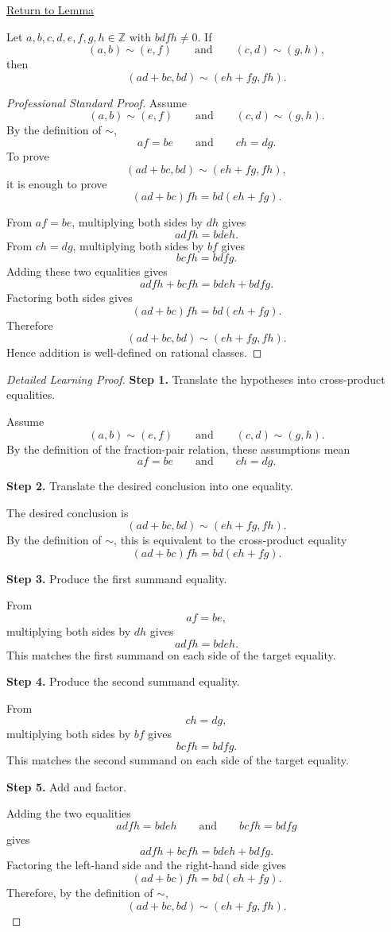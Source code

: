 \newpage
{}
\label{prf:rational-addition-well-defined}

\begin{remark*}[Return]
\hyperref[lem:rational-addition-well-defined]{Return to Lemma}
\end{remark*}

\begin{lemma*}
Let $a,b,c,d,e,f,g,h\in\mathbb{Z}$ with $bdfh\neq 0$. If
\[
(a,b)\sim(e,f)
\qquad\text{and}\qquad
(c,d)\sim(g,h),
\]
then
\[
(ad+bc,bd)\sim(eh+fg,fh).
\]
\end{lemma*}

\begin{proof}[Professional Standard Proof]
\LRAProofBodyStart
Assume
\[
(a,b)\sim(e,f)
\qquad\text{and}\qquad
(c,d)\sim(g,h).
\]
By the definition of $\sim$,
\[
af=be
\qquad\text{and}\qquad
ch=dg.
\]
To prove
\[
(ad+bc,bd)\sim(eh+fg,fh),
\]
it is enough to prove
\[
(ad+bc)fh=bd(eh+fg).
\]

From $af=be$, multiplying both sides by $dh$ gives
\[
adfh=bdeh.
\]
From $ch=dg$, multiplying both sides by $bf$ gives
\[
bcfh=bdfg.
\]
Adding these two equalities gives
\[
adfh+bcfh=bdeh+bdfg.
\]
Factoring both sides gives
\[
(ad+bc)fh=bd(eh+fg).
\]
Therefore
\[
(ad+bc,bd)\sim(eh+fg,fh).
\]
Hence addition is well-defined on rational classes.
\end{proof}

\begin{proof}[Detailed Learning Proof]
\LRAProofBodyStart

\textbf{Step 1.} Translate the hypotheses into cross-product equalities.

Assume
\[
(a,b)\sim(e,f)
\qquad\text{and}\qquad
(c,d)\sim(g,h).
\]
By the definition of the fraction-pair relation, these assumptions mean
\[
af=be
\qquad\text{and}\qquad
ch=dg.
\]

\textbf{Step 2.} Translate the desired conclusion into one equality.

The desired conclusion is
\[
(ad+bc,bd)\sim(eh+fg,fh).
\]
By the definition of $\sim$, this is equivalent to the cross-product equality
\[
(ad+bc)fh=bd(eh+fg).
\]

\textbf{Step 3.} Produce the first summand equality.

From
\[
af=be,
\]
multiplying both sides by $dh$ gives
\[
adfh=bdeh.
\]
This matches the first summand on each side of the target equality.

\textbf{Step 4.} Produce the second summand equality.

From
\[
ch=dg,
\]
multiplying both sides by $bf$ gives
\[
bcfh=bdfg.
\]
This matches the second summand on each side of the target equality.

\textbf{Step 5.} Add and factor.

Adding the two equalities
\[
adfh=bdeh
\qquad\text{and}\qquad
bcfh=bdfg
\]
gives
\[
adfh+bcfh=bdeh+bdfg.
\]
Factoring the left-hand side and the right-hand side gives
\[
(ad+bc)fh=bd(eh+fg).
\]
Therefore, by the definition of $\sim$,
\[
(ad+bc,bd)\sim(eh+fg,fh).
\]
\end{proof}

